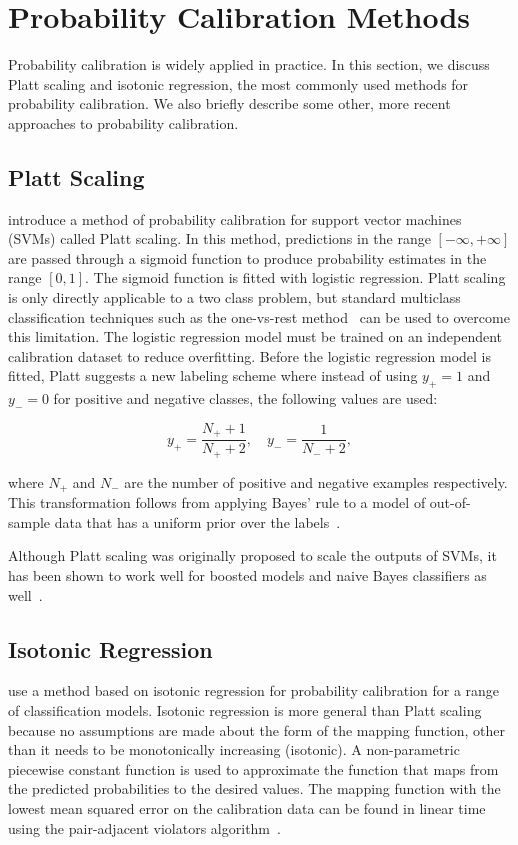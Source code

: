 \documentclass[wcp]{jmlr}
\begin{document}
\section{\label{sec:probability_calibration_methods}Probability Calibration Methods}
Probability calibration is widely applied in practice. In this section, we discuss Platt scaling and isotonic regression, the most commonly used methods for probability calibration. We also briefly describe some other, more recent approaches to probability calibration.

\subsection{Platt Scaling}
\cite{platt1999probabilistic} introduce a method of probability calibration for support vector machines (SVMs) called Platt scaling. In this method, predictions in the range $[-\infty, +\infty]$ are passed through a sigmoid function to produce probability estimates in the range $[0, 1]$. The sigmoid function is fitted with logistic regression. Platt scaling is only directly applicable to a two class problem, but standard multiclass classification techniques such as the one-vs-rest method~\citep{rifkin2004defense} can be used to overcome this limitation. The logistic regression model must be trained on an independent calibration dataset to reduce overfitting. Before the logistic regression model is fitted, Platt suggests a new labeling scheme where instead of using $y_+ = 1$ and $y_- = 0$ for positive and negative classes, the following values are used:

	\begin{equation}
		y_+ = \frac{N_+ + 1}{N_+ + 2},\quad y_- = \frac{1}{N_- + 2},
	\end{equation}
	
	where $N_+$ and $N_-$ are the number of positive and negative examples respectively. This transformation follows from applying Bayes' rule to a model of out-of-sample data that has a uniform prior over the labels~\citep{platt1999probabilistic}. 
	
	Although Platt scaling was originally proposed to scale the outputs of SVMs, it has been shown to work well for boosted models and naive Bayes classifiers as well~\citep{niculescu2005predicting}.


\subsection{Isotonic Regression}
\cite{zadrozny2001obtaining} use a method based on isotonic regression for probability calibration for a range of classification models. Isotonic regression is more general than Platt scaling because no assumptions are made about the form of the mapping function, other than it needs to be monotonically increasing (isotonic). A non-parametric piecewise constant function is used to approximate the function that maps from the predicted probabilities to the desired values. The mapping function with the lowest mean squared error on the calibration data can be found in linear time using the pair-adjacent violators algorithm~\citep{ayer1955empirical}.
\end{document}

